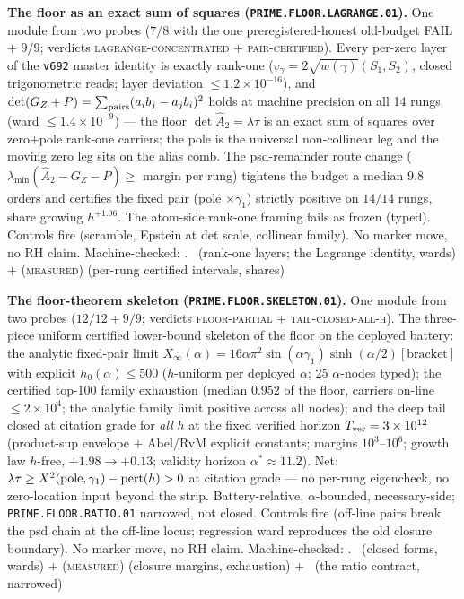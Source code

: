 \par\smallskip\noindent\textbf{The floor as an exact sum of
squares (\texttt{PRIME.FLOOR.LAGRANGE.01}).}
One module from two probes ($7/8$ with the one
preregistered-honest old-budget FAIL $+$ $9/9$; verdicts
\textsc{lagrange-concentrated} $+$ \textsc{pair-certified}).
Every per-zero layer of the \texttt{v692} master identity is
exactly rank-one ($v_\gamma=2\sqrt{w(\gamma)}(S_1,S_2)$, closed
trigonometric reads; layer deviation $\le1.2\times10^{-16}$), and
$\det(G_Z+P)=\sum_{\rm pairs}(a_ib_j-a_jb_i)^2$ holds at machine
precision on all 14 rungs (ward $\le1.4\times10^{-9}$) --- the
floor $\det\hat A_2=\lambda\tau$ is an exact sum of squares over
zero$+$pole rank-one carriers; the pole is the universal
non-collinear leg and the moving zero leg sits on the alias comb.
The psd-remainder route change ($\lambda_{\min}(\hat
A_2-G_Z-P)\ge$ margin per rung) tightens the budget a median
$9.8$ orders and certifies the fixed pair (pole
$\times\gamma_1$) strictly positive on $14/14$ rungs, share
growing $h^{+1.06}$.  The atom-side rank-one framing fails as
frozen (typed).  Controls fire (scramble, Epstein at det scale,
collinear family).  No marker move, no RH claim.
Machine-checked: .
\mE\ (rank-one layers; the Lagrange identity, wards) $+$
(\textsc{measured}) (per-rung certified intervals, shares)
\par\smallskip


\par\smallskip\noindent\textbf{The floor-theorem skeleton
(\texttt{PRIME.FLOOR.SKELETON.01}).}
One module from two probes ($12/12+9/9$; verdicts
\textsc{floor-partial} $+$ \textsc{tail-closed-all-h}).  The
three-piece uniform certified lower-bound skeleton of the floor
on the deployed battery: the analytic fixed-pair limit
$X_\infty(\alpha)=16\alpha\pi^2\sin(\alpha\gamma_1)
\sinh(\alpha/2)[\text{bracket}]$ with explicit $h_0(\alpha)\le
500$ ($h$-uniform per deployed $\alpha$; 25 $\alpha$-nodes
typed); the certified top-100 family exhaustion (median $0.952$
of the floor, carriers on-line $\le2\times10^4$; the analytic
family limit positive across all nodes); and the deep tail
closed at citation grade for \emph{all} $h$ at the fixed
verified horizon $T_{\rm ver}=3\times10^{12}$ (product-sup
envelope $+$ Abel/RvM explicit constants; margins
$10^3$--$10^6$; growth law $h$-free, $+1.98\to+0.13$; validity
horizon $\alpha^*\approx11.2$).  Net: $\lambda\tau\ge X^2({\rm
pole},\gamma_1)-{\rm pert}(h)>0$ at citation grade --- no
per-rung eigencheck, no zero-location input beyond the strip.
Battery-relative, $\alpha$-bounded, necessary-side;
\texttt{PRIME.FLOOR.RATIO.01} narrowed, not closed.  Controls
fire (off-line pairs break the psd chain at the off-line locus;
regression ward reproduces the old closure boundary).  No marker
move, no RH claim.
Machine-checked: .
\mE\ (closed forms, wards) $+$ (\textsc{measured}) (closure
margins, exhaustion) $+$ \mO\ (the ratio contract, narrowed)
\par\smallskip


